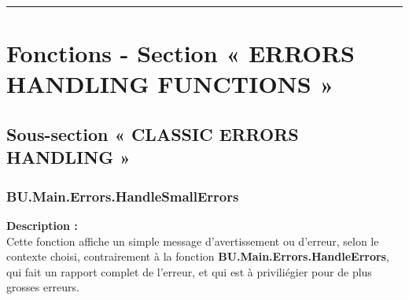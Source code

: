 \documentclass[a4paper,10pt]{article}
\begin{document}



    \color{sec1}\par\noindent\rule{\textwidth}{0.4pt}\color{text}

    \color{sec1}
    \section{Fonctions - Section « ERRORS HANDLING FUNCTIONS »}\color{text}

    \color{sec2}
    \subsection{Sous-section « CLASSIC ERRORS HANDLING »}\color{text}

    \color{sec3}
    \subsubsection{BU.Main.Errors.HandleSmallErrors}\color{text}

    \begin{justify}
        \textbf{Description :}\\
        Cette fonction affiche un simple message d'avertissement ou d'erreur, selon le contexte choisi, contrairement à la fonction \textbf{\color{func}BU.Main.Errors.HandleErrors}, qui fait un rapport complet de l'erreur, et qui est à priviliégier pour de plus grosses erreurs.
    \end{justify}
\end{document}
